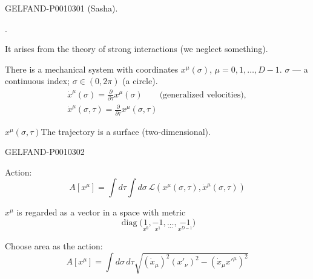 \begin{GelfandAdjacentEvidence}{GELFAND-P001030}{1}
 (Sasha).

.

It arises from the theory of strong interactions (we neglect something).

There is a mechanical system with coordinates $x^\mu(\sigma)$, $\mu=0,1,\ldots,D-1$.
$\sigma$ --- a continuous index; $\sigma\in(0,2\pi)$ (a circle).
\[
\begin{gathered}
\dot{x}^{\mu}(\sigma)=\frac{\partial}{\partial\tau}x^\mu(\sigma)
\qquad\text{(generalized velocities)},\\[.5ex]
\dot{x}^{\mu}(\sigma,\tau)=\frac{\partial}{\partial\tau}x^\mu(\sigma,\tau)
\end{gathered}
\]

$x^\mu(\sigma,\tau)$\qquad The trajectory is a surface (two-dimensional).
\end{GelfandAdjacentEvidence}
\begin{GelfandAdjacentEvidence}{GELFAND-P001030}{2}


Action:
\begin{equation*}
A[x^\mu]=\int d\tau\int d\sigma\,
\mathcal{L}(x^\mu(\sigma,\tau),\dot{x}^\mu(\sigma,\tau))
\tag{1}
\end{equation*}

$x^\mu$ is regarded as a vector in a space with metric
\[
\operatorname{diag}\bigl(\underset{x^0}{1},\underset{x^1}{-1},
\underset{\ldots}{\ldots},\underset{x^{D-1}}{-1}\bigr)
\]

Choose area as the action:
\begin{equation*}
A[x^\mu]=\int d\sigma\,d\tau
\sqrt{(\dot{x}_\mu)^2(x'_\nu)^2-(\dot{x}_\mu x'^{\mu})^2}
\tag{2}
\end{equation*}
\end{GelfandAdjacentEvidence}
